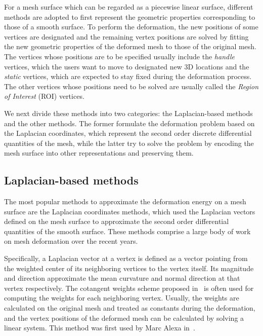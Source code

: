 For a mesh  surface which can be regarded as a piecewise linear
surface, different methods are adopted to first represent the
geometric properties corresponding to those of a smooth surface. To
perform the deformation, the new positions of some vertices are
designated and the remaining vertex positions are solved by fitting
the new geometric properties of the deformed mesh to those of the
original mesh. The vertices whose positions are to be specified
usually include the \textit{handle} vertices, which the users want
to move to designated new 3D locations and the \textit{static}
vertices, which are expected to stay fixed during the deformation
process. The other vertices whose positions need to be solved are
usually called the \textit{Region of Interest} (ROI) vertices.

We next divide  these methods into two categories: the
Laplacian-based methods and the other methods. The former formulate
the deformation problem based on the Laplacian coordinates, which
represent the second order discrete differential quantities of the
mesh, while the latter try to solve the problem by encoding the mesh
surface into other representations and preserving them.


\subsection{Laplacian-based methods}\label{ch2:sec:deformation:Lap}

The most popular methods  to approximate the deformation energy on a
mesh surface are the Laplacian coordinates methods, which used the
Laplacian vectors defined on the mesh surface to approximate the
second order differential quantities of the smooth surface. These
methods comprise a large body of work on mesh deformation over the
recent years.

Specifically, a Laplacian  vector at a vertex is defined as a vector
pointing from the weighted center of its neighboring vertices to the
vertex itself. Its magnitude and direction approximate the mean
curvature and normal direction at that vertex respectively. The
cotangent weights scheme proposed in~\cite{MDSB02} is often used for
computing the weights for each neighboring vertex. Usually, the
weights are calculated on the original mesh and treated as constants
during the deformation, and the vertex positions of the deformed
mesh can be calculated by solving a linear system. This method was
first used by Marc Alexa in~\cite{AM01}.

